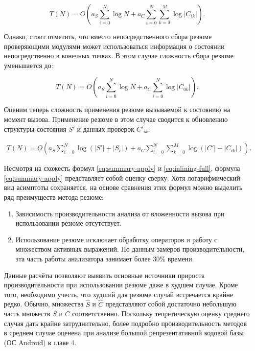 \begin{equation}
 T(N) = O \left(a_S \sum_{i=0}^N \log N  + a_C \sum_{i=0}^N \sum_{k=0}^M \log |C_{ik}| \right).
\end{equation}

Однако, стоит отметить, что вместо непосредственного сбора резюме проверяющими модулями может использоваться информация о состоянии непосредственно в конечных точках. В этом случае сложность сбора резюме уменьшается до:

\begin{equation}
 T(N) = O \left(a_S \sum_{i=0}^N \log N  + a_C \sum_{i=0}^N  \log |C_{0k}| \right).
\end{equation}

Оценим теперь сложность применения резюме вызываемой к состоянию на момент вызова. Применение резюме в этом случае сводится к обновлению структуры состояния $S'$ и данных проверок $C'_{ik}$:

\begin{equation}
\label{eq:summary-apply}
\begin{split}
 T(N) = O \left( a_S \sum_{i=0}^N \log \left(|S'| + |S_i|\right) +  a_C \sum_{i=0}^N \sum_{k=0}^M  \log \left(|C'|  + |C_{ik}|  \right) \right).
 \end{split}
\end{equation}

Несмотря на схожесть формул \ref{eq:summary-apply} и \ref{eq:inlining-full}, формула \ref{eq:summary-apply} представляет собой оценку сверху. Хотя логарифмический вид асимптоты сохраняется, на основе сравнения этих формул можно выделить ряд преимуществ метода резюме:

\begin{enumerate}
 \item Зависимость производительности анализа от вложенности вызова при использовании резюме отсутствует.
 \item Использование резюме исключает обработку операторов и работу с множеством активных выражений. По данным замеров производительности, эта часть работы анализатора занимает более 30\% времени.
\end{enumerate}

Данные расчёты позволяют выявить основные источники прироста производительности при использовании резюме даже в худшем случае. Кроме того, необходимо учесть, что худший для резюме случай встречается крайне редко. Обычно, множества $\widehat{S}$ и $\widehat{C}$ представляют собой достаточно небольшую часть множеств $S$ и $C$ соответственно. Поскольку теоретическую оценку среднего случая дать крайне затруднительно, более подробно производительность методов в среднем случае оценена при анализе большой репрезентативной кодовой базы (ОС Android) в главе 4.






